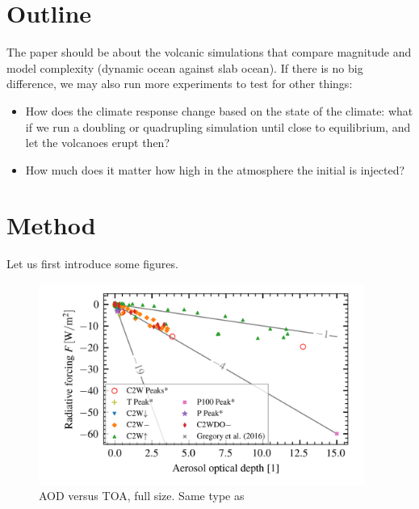 \documentclass{ametsocV5}
\begin{document}
\section{Outline}

The paper should be about the volcanic simulations that compare magnitude and model
complexity (dynamic ocean against slab ocean). If there is no big difference, we may
also run more experiments to test for other things:
\begin{itemize}
	\item How does the climate response change based on the state of the climate: what
	      if we run a  doubling or quadrupling simulation until close to
	      equilibrium, and let the volcanoes erupt then?
	\item How much does it matter how high in the atmosphere the initial  is
	      injected?
\end{itemize}

\section{Method}

Let us first introduce some figures.

\begin{figure}
	\begin{center}
		\includegraphics[width=0.95\textwidth]{figures/aod_vs_toa_avg_full.png}
	\end{center}
	\caption{AOD versus TOA, full size. Same type as \cite{gregory2016}}
	\label{fig:aod_vs_toa_full}
\end{figure}
\end{document}
